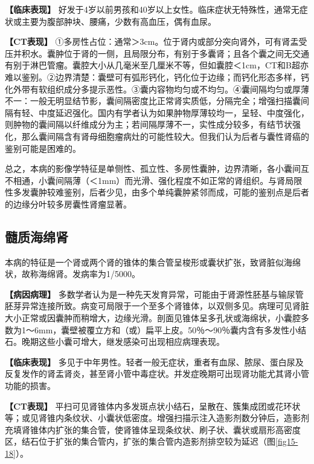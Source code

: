 \textbf{【临床表现】}
好发于4岁以前男孩和40岁以上女性。临床症状无特殊性，通常无症状或主要为腹部肿块、腰痛，少数有高血压，偶有血尿。

\textbf{【CT表现】}
①多房性占位：通常＞3cm。位于肾内或部分突向肾外，可有肾盂受压并积水。囊肿位于肾的一侧，且局限分布，有别于多囊肾；且各个囊之间无交通有别于淋巴管瘤。囊腔大小从几毫米至几厘米不等，但如囊腔＜1cm，CT和B超亦难以鉴别。②边界清楚：囊壁可有弧形钙化，钙化位于边缘；而钙化形态多样，钙化外带有软组织成分多提示恶性。③囊内容物均匀或不均匀。④囊间隔均匀或厚薄不一：一般无明显结节影，囊间隔密度比正常肾实质低，分隔完全；增强扫描囊间隔有轻、中度延迟强化。国内有学者认为如果肿物厚薄较均一，呈轻、中度强化，则肿物的囊间隔以纤维成分为主；若间隔厚薄不一，实性成分较多，有结节状强化，那么囊间隔含有肾母细胞瘤病灶的可能性较大。但我们认为后者与囊性肾癌的鉴别可能是困难的。

总之，本病的影像学特征是单侧性、孤立性、多房性囊肿，边界清晰，各小囊间互不相通，小囊间隔薄（＜1mm）而光滑、强化程度不如正常的肾组织。与肾局限性多发囊肿较难鉴别，后者少见，由多个单纯囊肿紧邻而成，可能的鉴别点是后者的边缘分叶较多房囊性肾瘤显著。

\subsection{髓质海绵肾}

本病的特征是一个肾或两个肾的锥体的集合管呈梭形或囊状扩张，致肾脏似海绵状，故称海绵肾。发病率为1/5000。

\textbf{【病因病理】}
多数学者认为是一种先天发育异常，可能由于肾源性胚基与输尿管胚芽异常连接所致。病变可局限于一个至多个肾锥体，以双侧多见。病理可见肾脏大小正常或因囊肿而稍增大，边缘光滑。剖面见锥体呈多孔状或海绵状，小囊腔多数为1～6mm，囊壁被覆立方和（或）扁平上皮。50％～90％囊内含有多发性小结石。晚期这些小囊可增大，继发感染可出现相应病理表现。

\textbf{【临床表现】}
多见于中年男性。轻者一般无症状，重者有血尿、脓尿、蛋白尿及反复发作的肾盂肾炎，甚至肾小管中毒症状。并发症晚期可出现肾功能尤其肾小管功能的损害。

\textbf{【CT表现】}
平扫可见肾锥体内多发斑点状小结石，呈散在、簇集成团或花环状等；或见肾锥内条纹状、小囊状低密度。增强扫描示注入造影剂数分钟后，造影剂充填肾锥体内扩张的集合管，使肾锥体呈现条纹状、刷子状、囊状或扇形高密度区，结石位于扩张的集合管内，扩张的集合管内造影剂排空较为延迟（图\ref{fig15-18}）。

